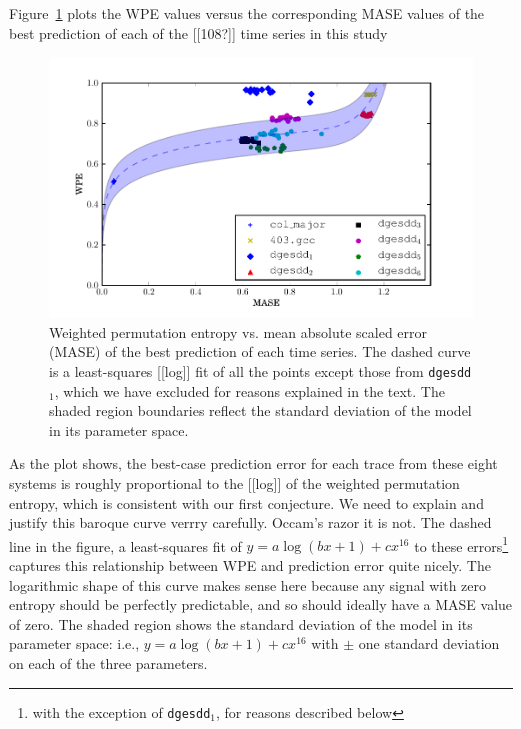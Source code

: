 Figure~\ref{fig:wpe_vs_mase_best} plots the WPE values versus the
corresponding MASE values of the best prediction of each of the
\alert{[[108?]]} time series in this study
\begin{figure}[htbp]
  \centering
  \includegraphics[width=\columnwidth]{figs/new_prediction_vs_entropy}
  \caption{Weighted permutation entropy vs. mean absolute scaled error
    (MASE) of the best prediction of each time series.
%
%
The dashed curve is a least-squares \alert{[[log]]} fit of all the
points except those from {\tt dgesdd$_1$}, which we have excluded for
reasons explained in the text.  The shaded region boundaries reflect
the standard deviation of the model in its parameter space.}
  \label{fig:wpe_vs_mase_best}
\end{figure}
As the plot shows, the best-case prediction error for each trace from
these eight systems is roughly proportional to the \alert{[[log]]} of
the weighted permutation entropy, which is consistent with our first
conjecture.  \alert{We need to explain and justify this baroque curve
  verrry carefully.  Occam's razor it is not.}  The dashed line in the
figure, a least-squares fit of $y = a \log(b x + 1) + c x^{16}$ to
these errors\footnote{with the exception of {\tt dgesdd$_1$}, for
  reasons described below} captures this relationship between WPE and
prediction error quite nicely.  The logarithmic shape of this curve
makes sense here because any signal with zero entropy should be
perfectly predictable, and so should ideally have a MASE value of
zero.  The shaded region shows the standard deviation of the model in
its parameter space: i.e., $y = a \log(b x + 1) + c x^{16}$ with $\pm$
one standard deviation on each of the three parameters.

